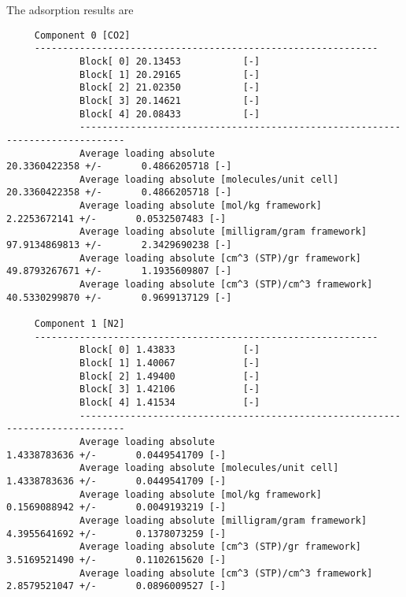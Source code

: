 \noindent
The adsorption results are
\begin{tiny}
\begin{verbatim}
     Component 0 [CO2]
     -------------------------------------------------------------
             Block[ 0] 20.13453           [-]
             Block[ 1] 20.29165           [-]
             Block[ 2] 21.02350           [-]
             Block[ 3] 20.14621           [-]
             Block[ 4] 20.08433           [-]
             ------------------------------------------------------------------------------
             Average loading absolute                             20.3360422358 +/-       0.4866205718 [-]
             Average loading absolute [molecules/unit cell]       20.3360422358 +/-       0.4866205718 [-]
             Average loading absolute [mol/kg framework]                  2.2253672141 +/-       0.0532507483 [-]
             Average loading absolute [milligram/gram framework]         97.9134869813 +/-       2.3429690238 [-]
             Average loading absolute [cm^3 (STP)/gr framework]          49.8793267671 +/-       1.1935609807 [-]
             Average loading absolute [cm^3 (STP)/cm^3 framework]        40.5330299870 +/-       0.9699137129 [-]

     Component 1 [N2]
     -------------------------------------------------------------
             Block[ 0] 1.43833            [-]
             Block[ 1] 1.40067            [-]
             Block[ 2] 1.49400            [-]
             Block[ 3] 1.42106            [-]
             Block[ 4] 1.41534            [-]
             ------------------------------------------------------------------------------
             Average loading absolute                              1.4338783636 +/-       0.0449541709 [-]
             Average loading absolute [molecules/unit cell]        1.4338783636 +/-       0.0449541709 [-]
             Average loading absolute [mol/kg framework]                  0.1569088942 +/-       0.0049193219 [-]
             Average loading absolute [milligram/gram framework]          4.3955641692 +/-       0.1378073259 [-]
             Average loading absolute [cm^3 (STP)/gr framework]           3.5169521490 +/-       0.1102615620 [-]
             Average loading absolute [cm^3 (STP)/cm^3 framework]         2.8579521047 +/-       0.0896009527 [-]
\end{verbatim}
\end{tiny}

